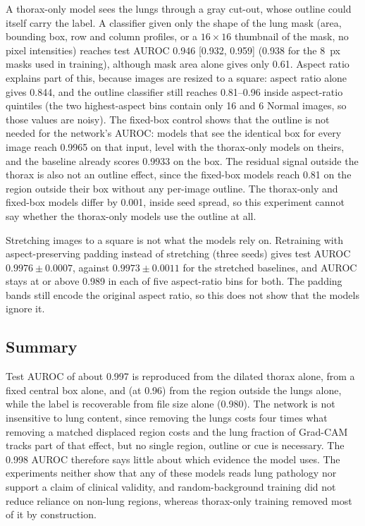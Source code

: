A thorax-only model sees the lungs through a gray cut-out, whose outline could itself carry the label. A
classifier given only the shape of the lung mask (area, bounding box, row and column profiles, or a
$16\times16$ thumbnail of the mask, no pixel intensities) reaches test AUROC 0.946 [0.932, 0.959] (0.938 for
the 8~px masks used in training), although mask area alone gives only 0.61. Aspect ratio explains part of this,
because images are resized to a square: aspect ratio alone gives 0.844, and the outline classifier still
reaches 0.81--0.96 inside aspect-ratio quintiles (the two highest-aspect bins contain only 16 and 6 Normal
images, so those values are noisy). The fixed-box control shows that the outline is not needed for the
network's AUROC: models that see the identical box for every image reach 0.9965 on that input, level with the
thorax-only models on theirs, and the baseline already scores 0.9933 on the box. The residual signal outside
the thorax is also not an outline effect, since the fixed-box models reach 0.81 on the region outside their box
without any per-image outline. The thorax-only and fixed-box models differ by 0.001, inside seed spread, so
this experiment cannot say whether the thorax-only models use the outline at all.

Stretching images to a square is not what the models rely on. Retraining with aspect-preserving padding
instead of stretching (three seeds) gives test AUROC $0.9976\pm0.0007$, against $0.9973\pm0.0011$ for the
stretched baselines, and AUROC stays at or above 0.989 in each of five aspect-ratio bins for both. The padding
bands still encode the original aspect ratio, so this does not show that the models ignore it.

\subsection{Summary}
Test AUROC of about 0.997 is reproduced from the dilated thorax alone, from a fixed central box alone, and (at
0.96) from the region outside the lungs alone, while the label is recoverable from file size alone (0.980).
The network is not insensitive to lung content, since removing the lungs costs four times what removing a
matched displaced region costs and the lung fraction of Grad-CAM tracks part of that effect, but no single
region, outline or cue is necessary. The 0.998 AUROC therefore says little about which evidence the model
uses. The experiments neither show that any of these models reads lung pathology nor support a claim of
clinical validity, and random-background training did not reduce reliance on non-lung regions, whereas
thorax-only training removed most of it by construction.
